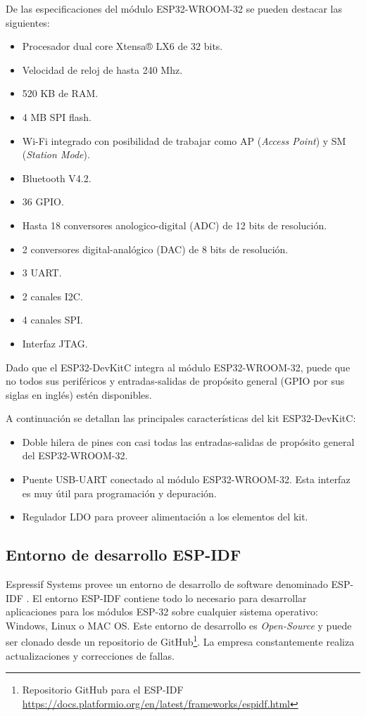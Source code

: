 De las especificaciones del módulo ESP32-WROOM-32 se pueden destacar las siguientes:
\begin{itemize}
\item Procesador dual core Xtensa® LX6 de 32 bits.
\item Velocidad de reloj de hasta 240 Mhz.
\item 520 KB de RAM.
\item 4 MB SPI flash.
\item Wi-Fi integrado con posibilidad de trabajar como AP (\textit{Access Point}) y SM (\textit{Station Mode}).
\item Bluetooth V4.2.
\item 36 GPIO.
\item Hasta 18 conversores anologico-digital (ADC) de 12 bits de resolución.
\item 2 conversores digital-analógico (DAC) de 8 bits de resolución.
\item 3 UART.
\item 2 canales I2C.
\item 4 canales SPI.
\item Interfaz JTAG.
\end{itemize}

Dado que el ESP32-DevKitC integra al módulo ESP32-WROOM-32, puede que no todos sus periféricos y entradas-salidas de propósito general (GPIO por sus siglas en inglés) estén disponibles. 

A continuación se detallan las principales características del kit ESP32-DevKitC:
\begin{itemize}
\item Doble hilera de pines con casi todas las entradas-salidas de propósito general del ESP32-WROOM-32.
\item Puente USB-UART conectado al módulo ESP32-WROOM-32. Esta interfaz es muy útil para programación y depuración.
\item Regulador LDO para proveer alimentación a los elementos del kit. 
\end{itemize}

\subsection{Entorno de desarrollo ESP-IDF}
\label{sec:ESPIDF}

Espressif Systems provee un entorno de desarrollo de software denominado ESP-IDF \citep{ESPIDF}. El entorno ESP-IDF contiene todo lo necesario para desarrollar aplicaciones para los módulos ESP-32 sobre cualquier sistema operativo: Windows, Linux o MAC OS. Este entorno de desarrollo es \textit{Open-Source} y puede ser clonado desde un repositorio de GitHub\footnote{Repositorio GitHub para el ESP-IDF \url{https://docs.platformio.org/en/latest/frameworks/espidf.html}}. La empresa constantemente realiza actualizaciones y correcciones de fallas.

